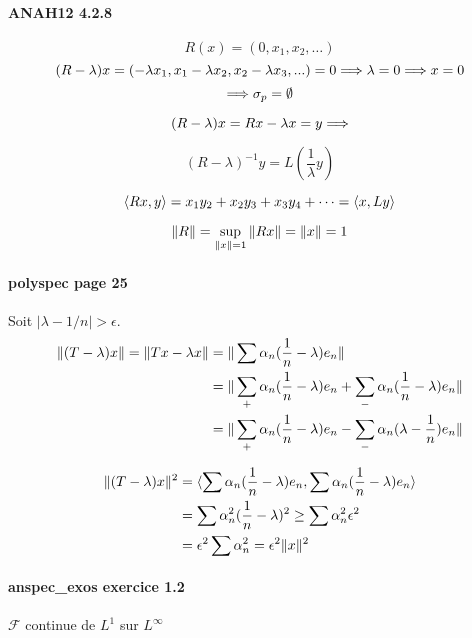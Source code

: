 \paragraph{ANAH12 4.2.8}
$$R(x)=(0, x_1, x_2, \ldots)$$
%
$$(R - \lambda)x = (-\lambda x_1, x_1 - \lambda x_2, x_2 - \lambda x_3, ...)
= 0 \Longrightarrow \lambda = 0 \Longrightarrow x = 0$$
$$\Longrightarrow \sigma_p = \emptyset$$

$$(R - \lambda)x = Rx - \lambda x = y \Longrightarrow $$


$$(R - \lambda)^{-1}y = L(\frac{1}{\lambda} y)$$


$$\langle Rx, y \rangle = x_1 y_2 + x_2 y_3 + x_3 y_4 + \cdots = \langle x, Ly \rangle$$



$$\| R \| = \sup_{\| x \| = 1} \| Rx \| = \| x \| = 1$$



\paragraph{polyspec page 25}

Soit $|\lambda - 1/n| > \epsilon$.
\begin{align}
    \| (T - \lambda)x \| = \| Tx - \lambda x \|
    &= \| \sum \alpha_n (\frac{1}{n} - \lambda) e_n \| \\
    &= \| \sum_{+} \alpha_n (\frac{1}{n} - \lambda) e_n
    + \sum_{-} \alpha_n (\frac{1}{n} - \lambda) e_n \| \\
    &= \| \sum_{+} \alpha_n (\frac{1}{n} - \lambda) e_n
    - \sum_{-} \alpha_n (\lambda - \frac{1}{n}) e_n \| \\
\end{align}

\begin{align}
    \| (T - \lambda)x \|^2
    &= \langle \sum \alpha_n (\frac{1}{n} - \lambda) e_n, \sum \alpha_n (\frac{1}{n} - \lambda) e_n \rangle \\
    &= \sum \alpha_n^2 (\frac{1}{n} - \lambda)^2
    \geq \sum \alpha_n^2 \epsilon^2 \\
    &= \epsilon^2 \sum \alpha_n^2 = \epsilon^2 \| x \|^2
\end{align}






\paragraph{anspec\_exos exercice 1.2}
$\mathcal{F}$ continue de $L^1$ sur $L^\infty$

